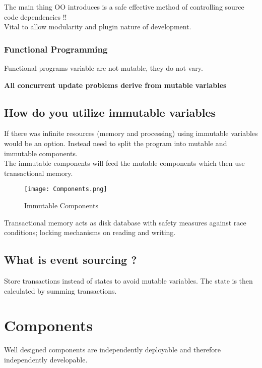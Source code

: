 \documentclass[11pt]{scrartcl} %
\begin{document}
The main thing OO introduces is a safe effective method of controlling
source code dependencies !!\\

Vital to allow modularity and plugin nature of development.

\subsubsection{Functional Programming}

Functional programs variable are not mutable, they do not vary.

\textbf{All concurrent update problems derive from mutable variables}

\subsection{How do you utilize immutable variables}

If there was infinite resources (memory and processing) using immutable
variables would be an option. Instead need to split the program into
mutable and immutable components.\\

The immutable components will feed the mutable components which then use
transactional memory.\\

\begin{figure}[h] %
	\centering
	\texttt{[image: Components.png]} %
	\caption{Immutable Components}
\end{figure}

Transactional memory acts as disk database with safety measures against
race conditions; locking mechanisms on reading and writing.

\subsection{What is event sourcing ?}

Store transactions instead of states to avoid mutable variables. The
state is then calculated by summing transactions.

\section{Components}

Well designed components are independently deployable and therefore
independently developable.\\
\end{document}
